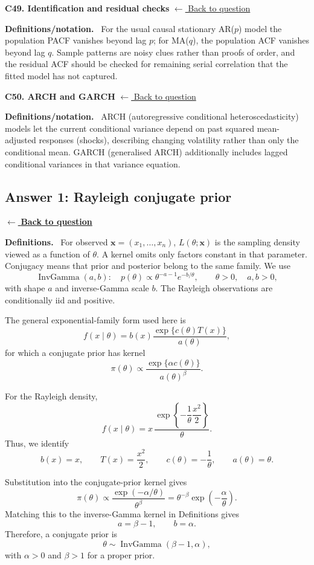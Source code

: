 \documentclass[11pt,a4paper]{article}
\newcommand{\given}{\mathrel{|}}
\newcommand{\xvec}{\boldsymbol{x}}
\DeclareMathOperator{\InvGamma}{InvGamma}
\newcommand{\answernav}[1]{%
  \label{answer:#1}%
  \noindent\hyperref[question:#1]{$\leftarrow$ \textbf{Back to question}}%
  \par\smallskip}
\newcommand{\studyheading}[1]{%
  \par\medskip\noindent\textcolor{statblue}{\textbf{#1.}}\ }
\newenvironment{conceptanswer}[2]
  {\par\addvspace{10pt}\noindent\begin{minipage}{\linewidth}%
   \hypertarget{concept-answer:#1}{}%
   \textcolor{statblue}{\textbf{C#1. #2}}\hfill%
   {\footnotesize\hyperlink{concept-question:#1}{$\leftarrow$ Back to question}}%
   \par\smallskip\textbf{Definitions/notation.}\ }
  {\end{minipage}\par}
\begin{document}
\begin{conceptanswer}{49}{Identification and residual checks}
For the usual causal stationary AR($p$) model the population PACF
vanishes beyond lag $p$; for MA($q$), the population ACF vanishes
beyond lag $q$.
Sample patterns are noisy clues rather than proofs of order, and
the residual ACF should be checked for remaining serial correlation
that the fitted model has not captured.
\end{conceptanswer}

\begin{conceptanswer}{50}{ARCH and GARCH}
ARCH (autoregressive conditional heteroscedasticity) models let the
current conditional variance depend on past squared mean-adjusted
responses (shocks),
describing changing volatility rather than only the conditional mean.
GARCH (generalised ARCH) additionally includes lagged conditional
variances in that variance equation.
\end{conceptanswer}

\clearpage

\subsection{Answer 1: Rayleigh conjugate prior}
\answernav{1}

\studyheading{Definitions}
For observed $\xvec=(x_1,\ldots,x_n)$, $L(\theta;\xvec)$ is the sampling density viewed as a function of $\theta$. A kernel omits only factors constant in that parameter. Conjugacy means that prior and posterior belong to the same family. We use
\[
\InvGamma(a,b):\quad p(\theta)\propto\theta^{-a-1}e^{-b/\theta},
\qquad \theta>0,\quad a,b>0,
\]
with shape $a$ and inverse-Gamma scale $b$. The Rayleigh observations are conditionally iid and positive.

The general exponential-family form used here is
\[
  f(x\given\theta)
  =b(x)\frac{\exp\{c(\theta)T(x)\}}{a(\theta)},
\]
for which a conjugate prior has kernel
\[
  \pi(\theta)
  \propto
  \frac{\exp\{\alpha c(\theta)\}}{a(\theta)^\beta}.
\]

For the Rayleigh density,
\[
  f(x\given\theta)
  =x\,
    \frac{\exp\left\{-\dfrac{1}{\theta}\dfrac{x^2}{2}\right\}}
         {\theta}.
\]
Thus, we identify
\[
  b(x)=x,
  \qquad
  T(x)=\frac{x^2}{2},
  \qquad
  c(\theta)=-\frac{1}{\theta},
  \qquad
  a(\theta)=\theta.
\]

Substitution into the conjugate-prior kernel gives
\[
  \pi(\theta)
  \propto
  \frac{\exp(-\alpha/\theta)}{\theta^\beta}
  =\theta^{-\beta}\exp\left(-\frac{\alpha}{\theta}\right).
\]
Matching this to the inverse-Gamma kernel in Definitions gives
\[
  a=\beta-1,
  \qquad
  b=\alpha.
\]
Therefore, a conjugate prior is
\[
  \boxed{\theta\sim\InvGamma(\beta-1,\alpha)},
\]
with $\alpha>0$ and $\beta>1$ for a proper prior.
\end{document}
